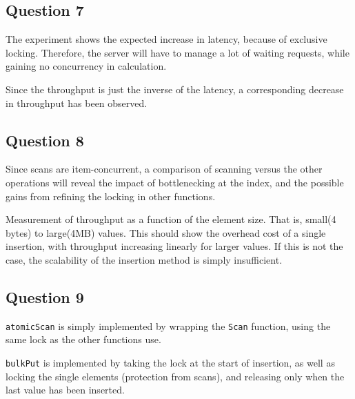 \documentclass[11pt,a4paper]{article}
\begin{document}
\subsection{Question 7}
The experiment shows the expected increase in latency, because of exclusive locking.
Therefore, the server will have to manage a lot of waiting requests, while
gaining no concurrency in calculation.

Since the throughput is just the inverse of the latency, a corresponding decrease
in throughput has been observed.


\subsection{Question 8}
Since scans are item-concurrent, a comparison of scanning versus the other operations
will reveal the impact of bottlenecking at the index, and the possible gains from refining the
locking in other functions.

Measurement of throughput as a function of the element size. That is, small(4 bytes) to large(4MB)
values. This should show the overhead cost of a single insertion, with throughput increasing
linearly for larger values. If this is not the case, the scalability of the insertion method
is simply insufficient.


\subsection{Question 9}
{\tt atomicScan} is simply implemented by wrapping the {\tt Scan} function,
using the same lock as the other functions use.

{\tt bulkPut} is implemented by taking the lock at the start of insertion, as
well as locking the single elements (protection from scans), and releasing only
when the last value has been inserted.
\end{document}
